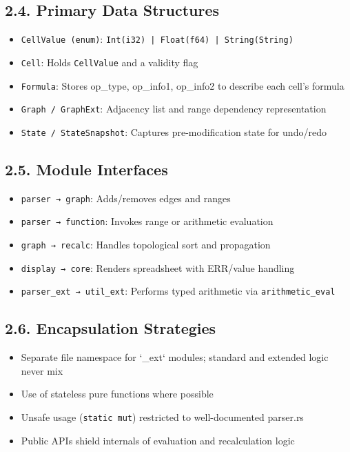 \subsection*{2.4. Primary Data Structures}
\begin{itemize}
    \item \texttt{CellValue (enum)}: \texttt{Int(i32) | Float(f64) | String(String)}
    \item \texttt{Cell}: Holds \texttt{CellValue} and a validity flag
    \item \texttt{Formula}: Stores op\_type, op\_info1, op\_info2 to describe each cell’s formula
    \item \texttt{Graph / GraphExt}: Adjacency list and range dependency representation
    \item \texttt{State / StateSnapshot}: Captures pre-modification state for undo/redo
\end{itemize}

\subsection*{2.5. Module Interfaces}
\begin{itemize}
    \item \texttt{parser → graph}: Adds/removes edges and ranges
    \item \texttt{parser → function}: Invokes range or arithmetic evaluation
    \item \texttt{graph → recalc}: Handles topological sort and propagation
    \item \texttt{display → core}: Renders spreadsheet with ERR/value handling
    \item \texttt{parser\_ext → util\_ext}: Performs typed arithmetic via \texttt{arithmetic\_eval}
\end{itemize}

\subsection*{2.6. Encapsulation Strategies}
\begin{itemize}
    \item Separate file namespace for `\_ext` modules; standard and extended logic never mix
    \item Use of stateless pure functions where possible
    \item Unsafe usage (\texttt{static mut}) restricted to well-documented parser.rs
    \item Public APIs shield internals of evaluation and recalculation logic
\end{itemize}

